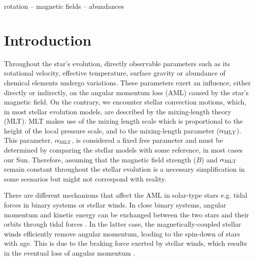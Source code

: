 \documentclass[fleqn,usenatbib]{mnras}
\begin{document}
\begin{keywords}
rotation -- magnetic fields -- abundances
\end{keywords}



\section{Introduction} \label{sec_intro}
Throughout the star's evolution, directly observable parameters such as its rotational velocity, effective temperature, surface gravity or abundance of chemical elements undergo variations. These parameters exert an influence, either directly or indirectly, on the angular momentum loss (AML) caused by the star's magnetic field. On the contrary, we encounter stellar convection motions, which, in most stellar evolution models, are described by the mixing-length theory (MLT). MLT makes use of the mixing length scale which is proportional to the height of the local pressure scale, and to the mixing-length parameter ($\alpha_{\mathrm{MLT}}$). This parameter, $\alpha_{\mathrm{MLT}}$, is considered a fixed free parameter and must be determined by comparing the stellar models with some reference, in most cases our Sun. Therefore, assuming that the magnetic field strength ($B$) and $\alpha_{\mathrm{MLT}}$ remain constant throughout the stellar evolution is a necessary simplification in some scenarios but might not correspond with reality.\par

There are different mechanisms that affect the AML in solar-type stars e.g. tidal forces in binary systems or stellar winds. In close binary systems, angular momentum and kinetic energy can be exchanged between the two stars and their orbits through tidal forces \citep{Li2018}. In the latter case, the magnetically-coupled stellar winds efficiently remove angular momentum,  leading to the spin-down of stars with age. This is due to the braking force exerted by stellar winds, which results in the eventual loss of angular momentum \citep{UdDoula2002}.\par 
\end{document}
